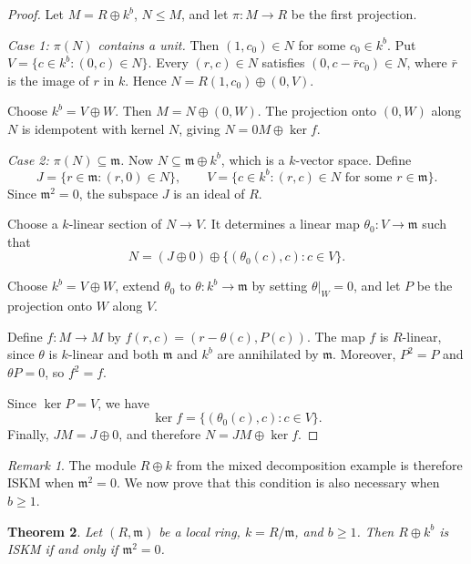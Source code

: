 \documentclass[11pt,a4paper]{article}
\newtheorem{theorem}{Theorem}[section]
\theoremstyle{definition}
\theoremstyle{remark}
\newtheorem{remark}[theorem]{Remark}
\begin{document}
\begin{proof}
Let $M=R\oplus k^b$, $N\leq M$, and let $\pi:M\to R$ be the first projection.

\emph{Case 1: $\pi(N)$ contains a unit.}
Then $(1,c_0)\in N$ for some $c_0\in k^b$. Put $V=\{c\in k^b:(0,c)\in N\}$. Every $(r,c)\in N$ satisfies $(0,c-\bar r c_0)\in N$, where $\bar r$ is the image of $r$ in $k$. Hence $N=R(1,c_0)\oplus(0,V)$.

Choose $k^b=V\oplus W$. Then $M=N\oplus(0,W)$. The projection onto $(0,W)$ along $N$ is idempotent with kernel $N$, giving $N=0M\oplus\ker f$.

\emph{Case 2: $\pi(N)\subseteq\mathfrak m$.}
Now $N\subseteq\mathfrak m\oplus k^b$, which is a $k$-vector space. Define
\[
J=\{r\in\mathfrak m:(r,0)\in N\},
\qquad
V=\{c\in k^b:(r,c)\in N
\text{ for some }r\in\mathfrak m\}.
\]
Since $\mathfrak m^2=0$, the subspace $J$ is an ideal of $R$.

Choose a $k$-linear section of $N\to V$. It determines a linear map $\theta_0:V\to\mathfrak m$ such that
\[
N=(J\oplus0)\oplus
\{(\theta_0(c),c):c\in V\}.
\]

Choose $k^b=V\oplus W$, extend $\theta_0$ to $\theta:k^b\to\mathfrak m$ by setting $\theta|_W=0$, and let $P$ be the projection onto $W$ along $V$.

Define $f:M\to M$ by $f(r,c)=(r-\theta(c),P(c))$. The map $f$ is $R$-linear, since $\theta$ is
$k$-linear and both $\mathfrak m$ and $k^b$
are annihilated by $\mathfrak m$.
Moreover, $P^2=P$ and $\theta P=0$,
so $f^2=f$.

Since $\ker P=V$, we have
\[
\ker f=\{(\theta_0(c),c):c\in V\}.
\]
Finally, $JM=J\oplus0$, and therefore $N=JM\oplus\ker f$.
\end{proof}

\begin{remark}
The module $R\oplus k$ from the mixed decomposition example is therefore ISKM when $\mathfrak m^2=0$. We now prove that this condition is also necessary when $b\geq1$.
\end{remark}

\begin{theorem} 
\label{thm:sharp}
Let $(R,\mathfrak m)$ be a local ring, $k=R/\mathfrak m$, and $b\geq1$. Then $R\oplus k^b$ is ISKM if and only if $\mathfrak m^2=0$.
\end{theorem}
\end{document}
